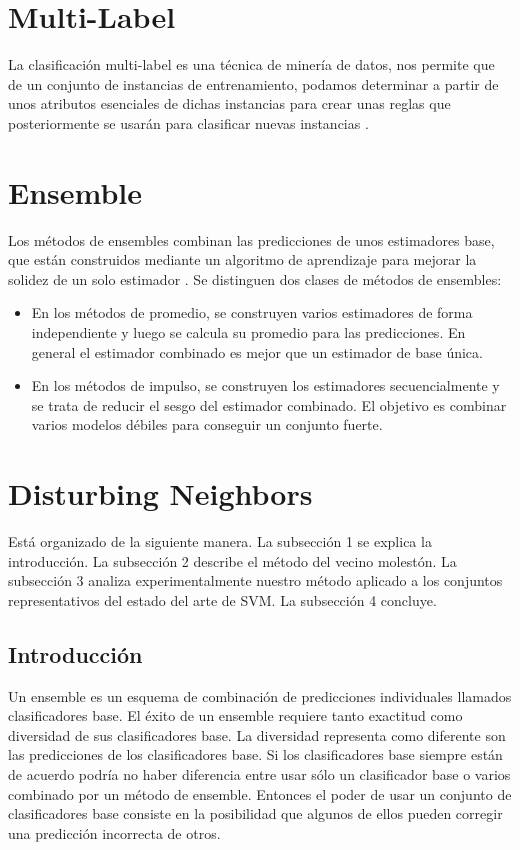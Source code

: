 \section{Multi-Label}
La clasificación multi-label es una técnica de minería de datos, nos permite que de un conjunto de instancias de entrenamiento, podamos determinar a partir de unos atributos esenciales de dichas instancias para crear unas reglas que posteriormente se usarán para clasificar nuevas instancias \cite{multilabel}.    

\section{Ensemble}
Los métodos de ensembles combinan las predicciones de unos estimadores base, que están construidos mediante un algoritmo de aprendizaje para mejorar la solidez de un solo estimador \cite{ensemble}.
Se distinguen dos clases de métodos de ensembles:
	\begin{itemize}
		\item En los métodos de promedio, se construyen varios estimadores de forma independiente y luego se calcula su promedio para las predicciones. En general el estimador combinado es mejor que un estimador de base única.
		\item En los métodos de impulso, se construyen los estimadores secuencialmente y se trata de reducir el sesgo del estimador combinado. El objetivo es combinar varios modelos débiles para conseguir un conjunto fuerte.
	\end{itemize}



\section{Disturbing Neighbors}
Está organizado de la siguiente manera. La subsección 1 se explica la introducción. La subsección 2 describe el método del vecino molestón. La subsección 3 analiza experimentalmente nuestro método aplicado a los conjuntos representativos del estado del arte de SVM. La subsección 4 concluye.
\subsection{Introducción}
Un ensemble es un esquema de combinación de predicciones individuales llamados clasificadores base. El éxito de un ensemble requiere tanto exactitud como diversidad de sus clasificadores base. La diversidad representa como diferente son las predicciones de los clasificadores base. Si los clasificadores base siempre están de acuerdo podría no haber diferencia entre usar sólo un clasificador base o varios combinado por un método de ensemble. Entonces el poder de usar un conjunto de clasificadores base consiste en la posibilidad que algunos de ellos pueden corregir una predicción incorrecta de otros.

